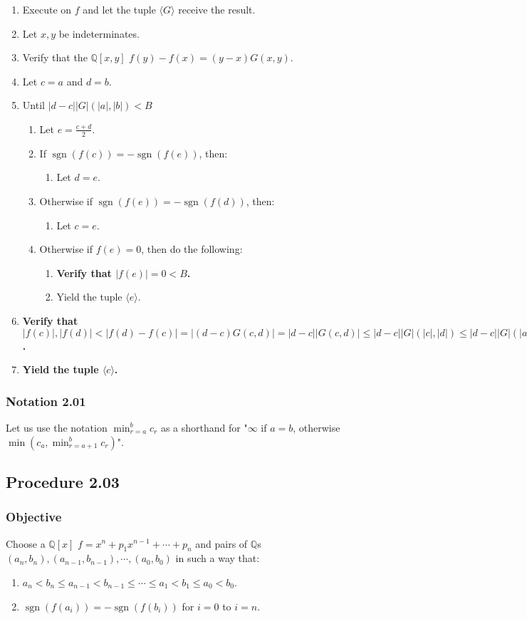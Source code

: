 \documentclass[twocolumn]{article}
\DeclareMathOperator{\sgn}{sgn}
\newcommand{\notation}[1]{\subsubsection*{Notation #1}}
\newcommand{\procedure}[2][]{\subsection*{Procedure #2 \ifthenelse{\equal{#1}{}}{}{(#1)}}\label{sec:procedure #2}}
\newcommand{\objective}{\subsubsection*{Objective}}
\newcommand{\procedurehr}[2][]{\hyperref[sec:procedure #2]{\ifthenelse{\equal{#1}{}}{procedure #2}{#1}}}
\begin{document}
				\begin{enumerate}
					\item Execute \procedurehr{2.00} on $f$ and let the tuple $\langle G\rangle$ receive the result.
					\item Let $x,y$ be indeterminates.
					\item Verify that the $\mathbb{Q}[x,y]$ $f(y)-f(x)=(y-x)G(x,y)$.
					\item Let $c=a$ and $d=b$.
					\item Until $\lvert d-c\rvert \lvert G\rvert(\lvert a\rvert,\lvert b\rvert)<B$
					\begin{enumerate}
						\item Let $e=\frac{c+d}{2}$.
						\item If $\sgn(f(c))=-\sgn(f(e))$, then:
						\begin{enumerate}
							\item Let $d=e$.
						\end{enumerate}
						\item Otherwise if $\sgn(f(e))=-\sgn(f(d))$, then:
						\begin{enumerate}
							\item Let $c=e$.
						\end{enumerate}
						\item Otherwise if $f(e)=0$, then do the following:
						\begin{enumerate}
							\item \textbf{Verify that $\lvert f(e)\rvert=0<B$.}
							\item Yield the tuple $\langle e\rangle$.
						\end{enumerate}
					\end{enumerate}
					\item \textbf{Verify that $\lvert f(c)\rvert,\lvert f(d)\rvert<\lvert f(d)-f(c)\rvert=\lvert(d-c)G(c,d)\rvert=\lvert d-c\rvert\lvert G(c,d)\rvert\le\lvert d-c\rvert\lvert G\rvert(\lvert c\rvert,\lvert d\rvert)\le\lvert d-c\rvert\lvert G\rvert(\lvert a\rvert,\lvert b\rvert)<B$.}
					\item \textbf{Yield the tuple $\langle c\rangle$.}
				\end{enumerate}
		\notation{2.01}
			Let us use the notation $\min_{r=a}^b c_r$ as a shorthand for "$\infty$ if $a=b$, otherwise $\min(c_a,\min_{r=a+1}^b c_r)$".
		\procedure{2.03}
			\objective
				Choose a $\mathbb{Q}[x]$ $f=x^n+p_1x^{n-1}+\cdots+p_n$ and pairs of $\mathbb{Q}$s $(a_n,b_n),(a_{n-1},b_{n-1}),\cdots,(a_0,b_0)$ in such a way that:
				\begin{enumerate}
					\item $a_n<b_n\le a_{n-1}<b_{n-1}\le\cdots\le a_1<b_1\le a_0<b_0$.
					\item $\sgn(f(a_i))=-\sgn(f(b_i))$ for $i=0$ to $i=n$.
				\end{enumerate}
\end{document}
